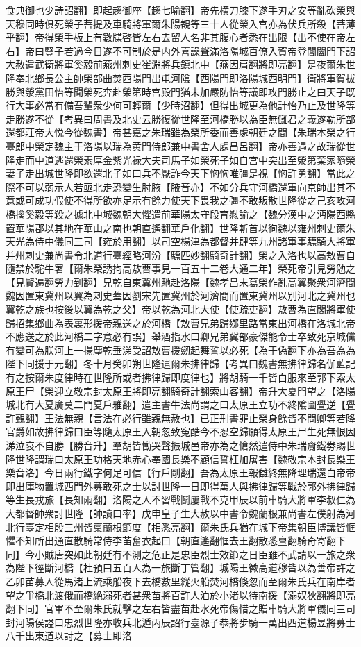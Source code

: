 食典御也少詩詔翻】即起趨御座【趨七喻翻】帝先横刀膝下遂手刃之安等亂砍榮與天穆同時俱死榮子菩提及車騎將軍爾朱陽覩等三十人從榮入宫亦為伏兵所殺【菩薄乎翻】帝得榮手板上有數牒啓皆左右去留人名非其腹心者悉在出限【出不使在帝左右】帝曰豎子若過今日遂不可制於是内外喜譟聲滿洛陽城百僚入賀帝登閶闔門下詔大赦遣武衛將軍奚毅前燕州刺史崔淵將兵鎮北中【燕因肩翻將即亮翻】是夜爾朱世隆奉北鄉長公主帥榮部曲焚西陽門出屯河隂【西陽門即洛陽城西明門】衛將軍賀拔勝與滎黨田怡等聞榮死奔赴榮第時宫殿門猶未加嚴防怡等議即攻門勝止之曰天子既行大事必當有備吾輩衆少何可輕爾【少時沼翻】但得出城更為他計怡乃止及世隆等走勝遂不從【考異曰周書及北史云勝復從世隆至河橋勝以為臣無讎君之義遂勒所部還都莊帝大悦今從魏書】帝甚嘉之朱瑞雖為榮所委而善處朝廷之間【朱瑞本榮之行臺郎中榮定魏主于洛陽以瑞為黄門侍郎兼中書舍人處昌呂翻】帝亦善遇之故瑞從世隆走而中道逃還榮素厚金紫光禄大夫司馬子如榮死子如自宫中突出至滎第棄家隨榮妻子走出城世隆即欲還北子如曰兵不厭詐今天下恟恟唯彊是視【恟許勇翻】當此之際不可以弱示人若亟北走恐變生肘腋【腋音亦】不如分兵守河橋還軍向京師出其不意或可成功假使不得所欲亦足示有餘力使天下畏我之彊不敢叛散世隆從之己亥攻河橋擒奚毅等殺之據北中城魏朝大懼遣前華陽太守段育慰諭之【魏分漢中之沔陽西縣置華陽郡以其地在華山之南也朝直遙翻華戶化翻】世隆斬首以徇魏以雍州刺史爾朱天光為侍中儀同三司【雍於用翻】以司空楊津為都督并肆等九州諸軍事驃騎大將軍并州刺史兼尚書令北道行臺經略河汾【驃匹妙翻騎奇計翻】榮之入洛也以高敖曹自隨禁於駝牛署【爾朱榮誘拘高敖曹事見一百五十二卷大通二年】榮死帝引見勞勉之【見賢遍翻勞力到翻】兄乾自東冀州馳赴洛陽【魏孝昌末葛榮作亂高翼聚衆河濟間魏因置東冀州以翼為刺史蓋因劉宋先置冀州於河濟間而置東冀州以别河北之冀州也翼乾之族也按後以翼為乾之父】帝以乾為河北大使【使疏吏翻】敖曹為直閣將軍使歸招集鄉曲為表裏形援帝親送之於河橋【敖曹兄弟歸鄉里路當東出河橋在洛城北帝不應送之於此河橋二字意必有誤】舉酒指水曰卿兄弟冀部豪傑能令士卒致死京城儻有變可為朕河上一揚塵乾垂涕受詔敖曹援劒起舞誓以必死【為于偽翻下亦為吾為為陛下同援于元翻】冬十月癸卯朔世隆遣爾朱拂律歸【考異曰魏書無拂律歸名伽藍記有之按爾朱度律時在世隆所或者拂律歸即度律也】將胡騎一千皆白服來至郭下索太原王尸【榮迎立敬宗封太原王將即亮翻騎奇計翻索山客翻】帝升大夏門望之【洛陽城北有大夏廣莫二門夏戶雅翻】遣主書牛法尚謂之曰太原王立功不終隂圖舋逆【舋許覲翻】王法無親【言法在必行雖親無赦也】已正刑書罪止榮身餘皆不問卿等若降官爵如故拂律歸曰臣等隨太原王入朝忽致寃酷今不忍空歸願得太原王尸生死無恨因涕泣哀不自勝【勝音升】羣胡皆慟哭聲振城邑帝亦為之愴然遣侍中朱瑞齎鐵劵賜世隆世隆謂瑞曰太原王功格天地赤心奉國長樂不顧信誓枉加屠害【魏敬宗本封長樂王樂音洛】今日兩行鐵字何足可信【行戶剛翻】吾為太原王報讎終無降理瑞還白帝帝即出庫物置城西門外募敢死之士以討世隆一日即得萬人與拂律歸等戰於郭外拂律歸等生長戎旅【長知兩翻】洛陽之人不習戰鬭屢戰不克甲辰以前車騎大將軍李叔仁為大都督帥衆討世隆【帥讀曰率】戊申皇子生大赦以中書令魏蘭根兼尚書左僕射為河北行臺定相殷三州皆稟蘭根節度【相悉亮翻】爾朱氏兵猶在城下帝集朝臣博議皆恇懼不知所出通直散騎常侍李苖奮衣起曰【朝直遙翻恇去王翻散悉亶翻騎奇寄翻下同】今小賊唐突如此朝廷有不測之危正是忠臣烈士效節之日臣雖不武請以一旅之衆為陛下徑斷河橋【杜預曰五百人為一旅斷丁管翻】城陽王徽高道穆皆以為善帝許之乙卯苗募人從馬渚上流乘船夜下去橋數里縱火船焚河橋倏忽而至爾朱氏兵在南岸者望之爭橋北渡俄而橋絶溺死者甚衆苗將百許人泊於小渚以待南援【溺奴狄翻將即亮翻下同】官軍不至爾朱氏就擊之左右皆盡苗赴水死帝傷惜之贈車騎大將軍儀同三司封河陽侯謚曰忠烈世隆亦收兵北遁丙辰詔行臺源子恭將步騎一萬出西道楊昱將募士八千出東道以討之【募士即洛